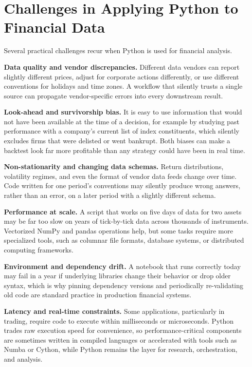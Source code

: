 \documentclass[../ai_in_finance]{subfiles}
\begin{document}
\section{Challenges in Applying Python to Financial Data}
\label{sec:python-challenges}

Several practical challenges recur when Python is used for financial analysis.

\textbf{Data quality and vendor discrepancies.} Different data vendors can report slightly different prices, adjust for corporate actions differently, or use different conventions for holidays and time zones. A workflow that silently trusts a single source can propagate vendor-specific errors into every downstream result.

\textbf{Look-ahead and survivorship bias.} It is easy to use information that would not have been available at the time of a decision, for example by studying past performance with a company's current list of index constituents, which silently excludes firms that were delisted or went bankrupt. Both biases can make a backtest look far more profitable than any strategy could have been in real time.

\textbf{Non-stationarity and changing data schemas.} Return distributions, volatility regimes, and even the format of vendor data feeds change over time. Code written for one period's conventions may silently produce wrong answers, rather than an error, on a later period with a slightly different schema.

\textbf{Performance at scale.} A script that works on five days of data for two assets may be far too slow on years of tick-by-tick data across thousands of instruments. Vectorized NumPy and pandas operations help, but some tasks require more specialized tools, such as columnar file formats, database systems, or distributed computing frameworks.

\textbf{Environment and dependency drift.} A notebook that runs correctly today may fail in a year if underlying libraries change their behavior or drop older syntax, which is why pinning dependency versions and periodically re-validating old code are standard practice in production financial systems.

\textbf{Latency and real-time constraints.} Some applications, particularly in trading, require code to execute within milliseconds or microseconds. Python trades raw execution speed for convenience, so performance-critical components are sometimes written in compiled languages or accelerated with tools such as Numba or Cython, while Python remains the layer for research, orchestration, and analysis.
\end{document}
